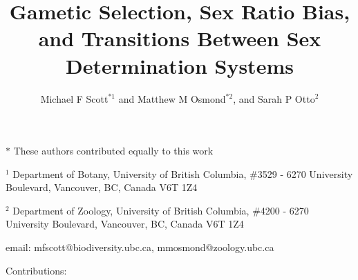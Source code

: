 \documentclass[12pt]{article}
\begin{document}
\title{Gametic Selection, Sex Ratio Bias, and Transitions Between Sex Determination Systems}
\author{Michael F Scott$^{*1}$ and Matthew M Osmond$^{*2}$, and Sarah P Otto$^2$}
\date{}
\maketitle
\noindent
$*$ These authors contributed equally to this work

\noindent
$^1$ Department of Botany, University of British Columbia, \#3529 - 6270 University Boulevard, Vancouver, BC, Canada V6T 1Z4

\noindent
$^2$ Department of Zoology, University of British Columbia, \#4200 - 6270 University Boulevard, Vancouver, BC, Canada V6T 1Z4

\noindent
email: mfscott@biodiversity.ubc.ca, mmosmond@zoology.ubc.ca

\noindent
Contributions: 

\newpage
\linenumbers
\modulolinenumbers[2]
\end{document}
